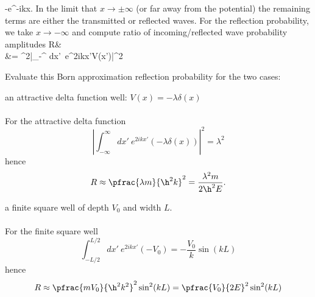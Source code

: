 \documentclass[10pt,letterpaper]{article}
\begin{document}
		-e^{-ikx}.
	\ea
	In the limit that $x\to\pm\infty$ (or far away from the potential) the remaining terms are either the transmitted or 	
	reflected waves. For the reflection probability, we take $x\to -\infty$ and compute ratio of incoming/reflected wave 
	probability amplitudes
	\ba
		R&\approx{}\\
		&= ^2\left|\int_{-\infty}^{\infty} dx'\ e^{2ikx'}V(x')\right|^2
	\ea
	\item
	Evaluate this Born approximation reflection probability for the two cases:
		\benum
		\item
		an attractive delta function well: $V(x) = -\lambda\delta(x)$
		\\
		\\
		For the attractive delta function 
		\[
			\left|\int_{-\infty}^{\infty} dx'\ e^{2ikx'}(-\lambda\delta(x))\right|^2 =\lambda^2
		\]
		hence
		\[
			R\approx \pfrac{\lambda m}{\h^2k}^2 = \frac{\lambda^2m}{2\h^2 E}.
		\]
		\item
		a finite square well of depth $V_0$ and width $L$.
		\\
		\\
		For the finite square well
		\[
			\int_{-L/2}^{L/2} dx'\ e^{2ikx'}(-V_0) = -\frac{V_0}{k}\sin(kL)
		\]
		hence
		\[
			R\approx \pfrac{mV_0}{\h^2k^2}^2\sin^2(kL) = \pfrac{V_0}{2E}^2\sin^2(kL)
		\]

		\eenum
	
\end{document}
